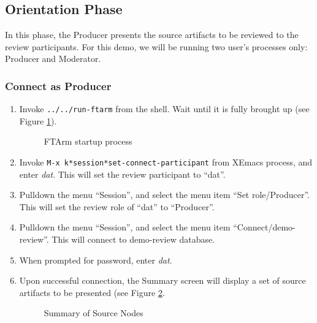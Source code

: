 \subsection{Orientation Phase}
In this phase, the Producer presents the source artifacts to be
reviewed to the review participants. 
For this demo, we will be running two user's processes only: Producer
and Moderator. 

\subsubsection {Connect as Producer}
\begin{enumerate}
\item Invoke {\tt ../../run-ftarm} from the shell.  Wait until it is fully
brought up (see Figure \ref{xemacs}). 
\begin{figure}[htb]
  {\centerline{}}
  \caption{FTArm startup process}
  \label{xemacs}
\end{figure}

\item Invoke {\tt M-x k*session*set-connect-participant} from XEmacs
process, and enter {\it dat}. This will set the review participant to
``dat''. 
\item Pulldown the menu ``Session'', and select the menu item ``Set
role/Producer''. This will set the review role of ``dat'' to
``Producer''. 
\item Pulldown the menu ``Session'', and select the menu item
``Connect/demo-review''. This will connect to demo-review database.
\item When prompted for password, enter {\it dat}.
\item Upon successful connection, the Summary screen will display a
set of source artifacts to be presented (see Figure \ref{summary-sources}.
\begin{figure}[htb]
  {\centerline{}}
  \caption{Summary of Source Nodes}
  \label{summary-sources}
\end{figure}

\end{enumerate}

